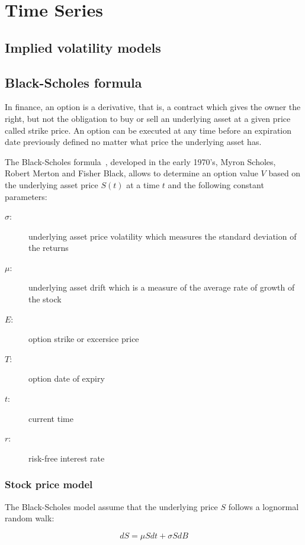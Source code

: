 
\chapter{Time Series}
\section{Implied volatility models}

\section{Black-Scholes formula}

In finance, an option is a derivative, that is, a contract which gives the owner the right, but not the obligation to buy or sell an underlying asset at a given price called strike price. An option can be executed at any time before an expiration date previously defined no matter what price the underlying asset has. 

The Black-Scholes formula~\cite{black1973}, developed in the early 1970's, Myron Scholes, Robert Merton and Fisher Black,  allows to determine an option value $V$ based on the underlying asset price $S(t)$ at a time $t$ and the following constant parameters: 

\begin{description}
\item [$\sigma$:] underlying asset price volatility which measures the standard deviation of the returns
\item [$\mu$:] underlying asset drift which is a measure of the average rate of growth of the stock
\item[$E$:] option strike or excersice price
\item[$T$:] option date of expiry
\item[$t$:] current time
\item[$r$:] risk-free interest rate
\end{description}

\subsection{Stock price model}

The Black-Scholes model assume that the underlying price $S$ follows a lognormal random walk:

\begin{equation}\label{eq:stockprice}
dS = \mu S dt + \sigma S dB
\end{equation}

